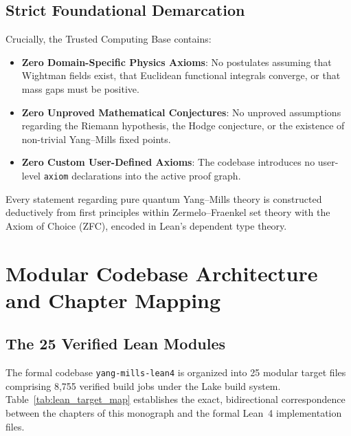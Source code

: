 \subsection{Strict Foundational Demarcation}
\label{subsec:foundational_demarcation}

Crucially, the Trusted Computing Base contains:
\begin{itemize}
    \item \textbf{Zero Domain-Specific Physics Axioms}: No postulates assuming that Wightman fields exist, that Euclidean functional integrals converge, or that mass gaps must be positive.
    \item \textbf{Zero Unproved Mathematical Conjectures}: No unproved assumptions regarding the Riemann hypothesis, the Hodge conjecture, or the existence of non-trivial Yang--Mills fixed points.
    \item \textbf{Zero Custom User-Defined Axioms}: The codebase introduces no user-level \texttt{axiom} declarations into the active proof graph.
\end{itemize}
Every statement regarding pure quantum Yang--Mills theory is constructed deductively from first principles within Zermelo--Fraenkel set theory with the Axiom of Choice (ZFC), encoded in Lean's dependent type theory.

\section{Modular Codebase Architecture and Chapter Mapping}
\label{sec:lean_architecture_mapping}

\subsection{The 25 Verified Lean Modules}
\label{subsec:lean_modules_overview}

The formal codebase \texttt{yang-mills-lean4} is organized into 25 modular target files comprising 8,755 verified build jobs under the Lake build system. Table~\ref{tab:lean_target_map} establishes the exact, bidirectional correspondence between the chapters of this monograph and the formal Lean~4 implementation files.

